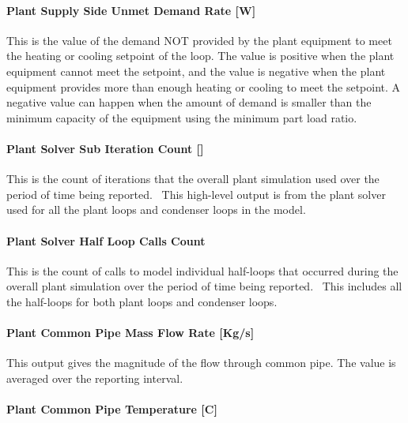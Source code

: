 \paragraph{Plant Supply Side Unmet Demand Rate {[}W{]}}\label{plant-supply-side-unmet-demand-rate-w}

This is the value of the demand NOT provided by the plant equipment to meet the heating or cooling setpoint of the loop. The value is positive when the plant equipment cannot meet the setpoint, and the value is negative when the plant equipment provides more than enough heating or cooling to meet the setpoint. A negative value can happen when the amount of demand is smaller than the minimum capacity of the equipment using the minimum part load ratio.

\paragraph{Plant Solver Sub Iteration Count {[]}}\label{plant-solver-sub-iteration-count}

This is the count of iterations that the overall plant simulation used over the period of time being reported.~ This high-level output is from the plant solver used for all the plant loops and condenser loops in the model.

\paragraph{Plant Solver Half Loop Calls Count}\label{plant-solver-half-loop-calls-count}

This is the count of calls to model individual half-loops that occurred during the overall plant simulation over the period of time being reported.~ This includes all the half-loops for both plant loops and condenser loops.

\paragraph{Plant Common Pipe Mass Flow Rate {[}Kg/s{]}}\label{plant-common-pipe-mass-flow-rate-kgs}

This output gives the magnitude of the flow through common pipe. The value is averaged over the reporting interval.

\paragraph{Plant Common Pipe Temperature {[}C{]}}\label{plant-common-pipe-temperature-c}

